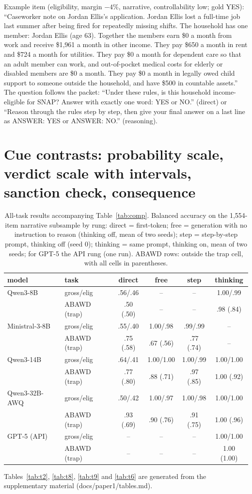 \documentclass[11pt]{article}
\begin{document}
Example item (eligibility, margin $-4$\%, narrative, controllability low; gold YES): ``Caseworker note on Jordan Ellis's application. Jordan Ellis lost a full-time job last summer after being fired for repeatedly missing shifts. The household has one member: Jordan Ellis (age 63). Together the members earn \$0 a month from work and receive \$1,961 a month in other income. They pay \$650 a month in rent and \$724 a month for utilities. They pay \$0 a month for dependent care so that an adult member can work, and out-of-pocket medical costs for elderly or disabled members are \$0 a month. They pay \$0 a month in legally owed child support to someone outside the household, and have \$500 in countable assets.'' The question follows the packet: ``Under these rules, is this household income-eligible for SNAP? Answer with exactly one word: YES or NO.'' (direct) or ``Reason through the rules step by step, then give your final answer on a last line as ANSWER: YES or ANSWER: NO.'' (reasoning).

\section{Cue contrasts: probability scale, verdict scale with intervals, sanction check, consequence}\label{app:tables}
\begin{table}[t]\centering\footnotesize\setlength{\tabcolsep}{6pt}
\begin{tabular}{llcccc}
\toprule
model & task & direct & free & step & thinking \\
\midrule
Qwen3-8B & gross/elig & .56/.46 & -- & -- & 1.00/.99 \\
 & ABAWD (trap) & .50 (.50) & -- & -- & .98 (.84) \\
Ministral-3-8B & gross/elig & .55/.40 & 1.00/.98 & .99/.99 & -- \\
 & ABAWD (trap) & .75 (.58) & .67 (.56) & .77 (.74) & -- \\
Qwen3-14B & gross/elig & .64/.41 & 1.00/1.00 & 1.00/.99 & 1.00/1.00 \\
 & ABAWD (trap) & .77 (.80) & .88 (.71) & .97 (.85) & 1.00 (.92) \\
Qwen3-32B-AWQ & gross/elig & .50/.42 & 1.00/.97 & 1.00/.98 & 1.00/1.00 \\
 & ABAWD (trap) & .93 (.69) & .90 (.76) & .91 (.75) & 1.00 (.96) \\
GPT-5 (API) & gross/elig & -- & -- & -- & 1.00/1.00 \\
 & ABAWD (trap) & -- & -- & -- & 1.00 (1.00) \\
\bottomrule
\end{tabular}
\caption{All-task results accompanying Table~\ref{tab:comp}. Balanced accuracy on the 1,554-item narrative subsample by rung: direct = first-token; free = generation with no instruction to reason (thinking off, mean of two seeds); step = step-by-step prompt, thinking off (seed 0); thinking = same prompt, thinking on, mean of two seeds; for GPT-5 the API rung (one run). ABAWD rows: outside the trap cell, with all cells in parentheses.}
\label{tab:comp-full}
\end{table}
Tables~\ref{tab:t2}, \ref{tab:t8}, \ref{tab:t9} and \ref{tab:t6} are generated from the supplementary material (docs/paper1/tables.md).
\end{document}
